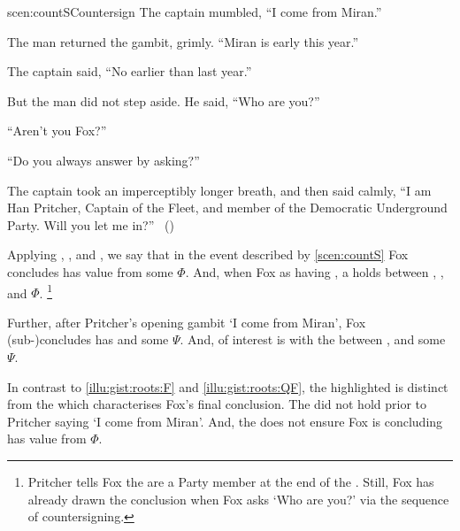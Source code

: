 \begin{note}
  \begin{rscenario}{scen:countS}{Countersign}%
    \indent The captain mumbled, ``I come from Miran.''

    The man returned the gambit, grimly.
    ``Miran is early this year.''

    The captain said, ``No earlier than last year.''

    But the man did not step aside.
    He said, ``Who are you?''

    ``Aren't you Fox?''

    ``Do you always answer by asking?''

    The captain took an imperceptibly longer breath, and then said calmly,
    ``I am Han Pritcher, Captain of the Fleet, and member of the Democratic Underground Party.
    Will you let me in?''%
    \mbox{ }\hfill\mbox{(\cite[70]{Asimov:1945aa})}%
    \newline
  \end{rscenario}

  \noindent%
  Applying , , and , we say that in the event described by \autoref{scen:countS} Fox concludes \propI{\signConA{}} has value  from some \pool{} \(\Phi\).
  And, when Fox \evals{} \propI{\signConA{}} as having , a \ros{} holds between \propI{\signConA{}}, , and \(\Phi\).%
  \footnote{
    Pritcher tells Fox the are a Party member at the end of the \scen{}.
    Still, Fox has already drawn the conclusion when Fox asks `Who are you?' via the sequence of countersigning.
  }

  Further, after Pritcher's opening gambit `I come from Miran', Fox (sub-)concludes  has   and some \pool{} \(\Psi\).
  And, of interest is with the \ros{} between ,  and some \pool{} \(\Psi\).

  In contrast to  \ref{illu:gist:roots:F} and \ref{illu:gist:roots:QF}, the highlighted \ros{} is distinct from the \ros{} which characterises Fox's final conclusion.
  The \ros{} did not hold prior to Pritcher saying `I come from Miran'.
  And, the \ros{} does not ensure Fox is concluding \propI{\signConA{}} has value  from \(\Phi\).


\end{note}
